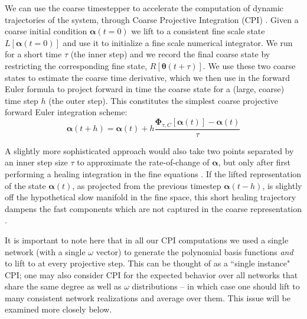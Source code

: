 \documentclass[numbers]{frontiersSCNS}
\renewcommand{\vec}[1]{\bm{#1}}
\DeclareRobustCommand{\inTstep}{\tau}
\DeclareRobustCommand{\outTstep}{h}
\begin{document}
We can use the coarse timestepper to accelerate
the computation of dynamic trajectories of the system,
through Coarse Projective Integration (CPI) \cite{WilliamGear2003,Lee2007}.
%
Given a coarse initial condition $\vec\alpha(t=0)$ we lift to
a consistent fine scale state $L[\vec\alpha(t=0)]$ and use it to
initialize a fine scale numerical integrator.
%
We run for a short time $\inTstep$ (the inner step) and
we record the final coarse state by restricting the corresponding fine state, $R[\vec\theta(t + \inTstep)]$.
%
We use these two coarse states to estimate the coarse time derivative, which
we then use in the forward Euler formula to project forward in time the coarse state
for a (large, coarse) time step $\outTstep$ (the outer step).
%
This constitutes the simplest coarse projective forward Euler integration scheme:
\begin{equation}
    \label{eqn:CPIeuler}
        \vec \alpha(t+\outTstep)
        =
        \vec \alpha(t)
        +
        \outTstep
        \frac{
            \vec\Phi_{\inTstep,C}[\vec\alpha(t)]
            -
            \vec\alpha(t)
        }{\inTstep}
\end{equation}


A slightly more sophisticated approach
would also take two points separated by an inner step size $\inTstep$
to approximate the rate-of-change of $\vec \alpha$,
but only after first performing a healing integration
in the fine equations
\cite{Gear2002}.
%
If the lifted representation of the state $\vec \alpha(t)$,
as projected from the previous timestep $\vec \alpha(t-\outTstep)$,
is slightly off the hypothetical slow manifold in the fine space,
this short healing trajectory dampens the fast components
which are not captured in the coarse representation
\cite{Vandekerckhove2011,Antonios2012,Gear2004}.

It is important to note here that in all our CPI computations we used
a single network (with a single $\omega$ vector)  to generate the polynomial 
basis functions {\em and} to lift to at every projective step.
%
This can be thought of as a ``single instance" CPI; one may also consider
CPI for the expected behavior over all networks that share the same 
degree as well as $\omega$ distributions -- in which case one should lift
to many consistent network realizations and average over them.
%
This issue will be examined more closely below.
\end{document}
